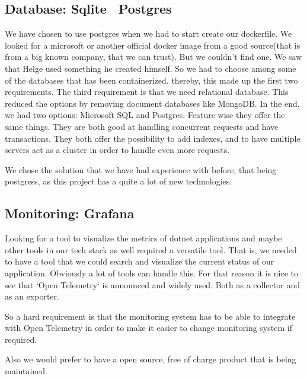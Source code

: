 \subsection{Database: Sqlite \rightarrow Postgres} %

We have chosen to use postgres when we had to start create our dockerfile. We looked for a microsoft or another official docker image from a good source(that is from a big known company, that we can trust). But we couldn’t find one. We saw that Helge used something he created himself. So we had to choose among some of the databases that has been containerized. thereby, this made up the first two requirements. The third requirement is that we need relational database. This reduced the options by removing document databases like MongoDB. In the end, we had two options: Microsoft SQL and Postgres.  Feature wise they offer the same things. They are both good at handling concurrent requests and have transactions. They both offer the possibility to add indexes, and to have multiple servers act as a cluster in order to handle even more requests.

We chose the solution that we have had experience with before, that being postgress, as this project has a quite a lot of new technologies.






\subsection{Monitoring: Grafana} %
Looking for a tool to visualize the metrics of dotnet applications and maybe other tools in our tech stack as well required a versatile tool. That is, we needed to have a tool that we could search and visualize the current status of our application. Obviously a lot of tools can handle this. For that reason it is nice to see that `Open Telemetry` is announced and widely used. Both as a collector and as an exporter. 

So a hard requirement is that the monitoring system has to be able to integrate with Open Telemetry in order to make it easier to change monitoring system if required. 

Also we would prefer to have a open source, free of charge product that is being maintained. 







